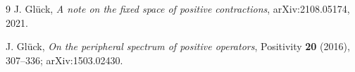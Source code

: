 \documentclass[11pt]{article}
\begin{document}
\begin{thebibliography}{9}
J. Gl\"uck,
\emph{A note on the fixed space of positive contractions},
arXiv:2108.05174, 2021.

J. Gl\"uck,
\emph{On the peripheral spectrum of positive operators},
Positivity \textbf{20} (2016), 307--336;
arXiv:1503.02430.
\end{thebibliography}
\end{document}
